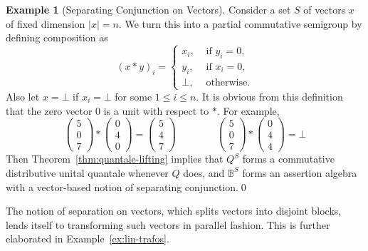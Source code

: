 \documentclass[12pt]{article}
\theoremstyle{definition}
\newtheorem{example}{Example}
\begin{document}
\begin{example}[Separating Conjunction on Vectors]\label{ex:separating-conjunction-vectors}
  Consider a set $S$ of vectors $x$ of fixed dimension $|x|= n$. We
  turn this into a partial commutative semigroup by defining composition as
  \begin{equation*}
    (x\ast y)_i=
    \begin{cases}
      x_i,&\text{ if } y_i=0,\\
      y_i,&\text{ if } x_i=0,\\
      \bot,& \text{ otherwise}.
    \end{cases}
  \end{equation*}
  Also let $x=\bot$ if $x_i=\bot$ for some $1\le i\le n$. It is
  obvious from this definition that the zero vector $0$ is a unit with
  respect to $\ast$. For example,
  \begin{equation*}
    \begin{pmatrix}
      5 \\ 0 \\ 7
    \end{pmatrix}
\ast
\begin{pmatrix}
  0 \\ 4 \\ 0
\end{pmatrix}
=
\begin{pmatrix}
  5 \\ 4 \\ 7
\end{pmatrix}
\qquad\qquad
    \begin{pmatrix}
      5 \\ 0 \\ 7
    \end{pmatrix}
\ast
\begin{pmatrix}
  0 \\ 4 \\ 4
\end{pmatrix}
=
\bot
  \end{equation*}
  Then Theorem~\ref{thm:quantale-lifting} implies that $Q^S$ forms a
  commutative distributive unital quantale whenever $Q$ does, and
  $\mathbb{B}^S$ forms an assertion algebra with a vector-based notion
  of separating conjunction.\qed
\end{example}
The notion of separation on vectors, which splits vectors into
disjoint blocks, lends itself to transforming such vectors in parallel
fashion. This is further elaborated in Example~\ref{ex:lin-trafos}.
\end{document}
